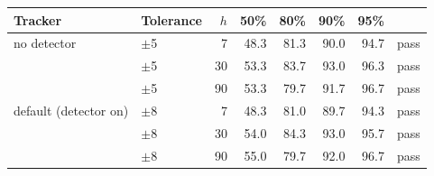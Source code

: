 \begin{tabular}{llr rrrr l}
\toprule
Tracker & Tolerance & $h$ & 50\% & 80\% & 90\% & 95\% & \\
\midrule
no detector & $\pm$5 & 7 & 48.3 & 81.3 & 90.0 & 94.7 & pass \\
 & $\pm$5 & 30 & 53.3 & 83.7 & 93.0 & 96.3 & pass \\
 & $\pm$5 & 90 & 53.3 & 79.7 & 91.7 & 96.7 & pass \\
default (detector on) & $\pm$8 & 7 & 48.3 & 81.0 & 89.7 & 94.3 & pass \\
 & $\pm$8 & 30 & 54.0 & 84.3 & 93.0 & 95.7 & pass \\
 & $\pm$8 & 90 & 55.0 & 79.7 & 92.0 & 96.7 & pass \\
\bottomrule
\end{tabular}
